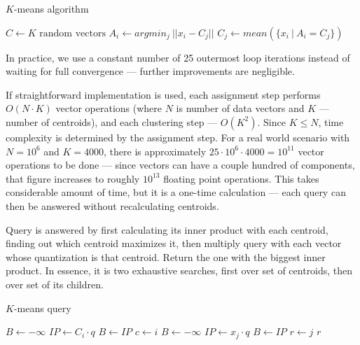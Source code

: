 \begin{algorithm}[H]
	\caption{$K$-means algorithm}
	\begin{algorithmic}
		\State $C \gets K \text{ random vectors}$
		\Repeat
				\State $A_i \gets argmin_{j} \ || x_i - C_j || $
			\EndFor
				\State $C_j \gets mean(\{x_i\ |\ A_i = C_j\}) $
			\EndFor

		\State {}
	\end{algorithmic}
\end{algorithm}

In practice, we use a constant number of 25 outermost loop iterations
instead of waiting for full convergence --- further improvements are negligible.

If straightforward implementation is used, each assignment step performs
$O(N \cdot K)$ vector operations (where $N$ is number of data vectors and
$K$ --- number of centroids), and each clustering step --- $O(K^2)$. Since
$K \le N$, time complexity is determined by the assignment step. For a real
world scenario with $N = 10^6$ and $K = 4000$, there is approximately
$25 \cdot 10^6 \cdot 4000 = 10^{11}$ vector operations to be done --- since vectors
can have a couple hundred of components, that figure increases to roughly
$10^{13}$ floating point operations. This takes considerable amount of time,
but it is a one-time calculation --- each query can then be answered without
recalculating centroids.

Query is answered by first calculating its inner product with each centroid,
finding out which centroid maximizes it, then multiply query with each vector
whose quantization is that centroid. Return the one
with the biggest inner product. In essence, it is two exhaustive searches,
first over set of centroids, then over set of its children.

\begin{algorithm}[H]
	\caption{$K$-means query}
	\begin{algorithmic}
		\State $B \gets -\infty$
		\For{$ i < K $}
			\State $IP \gets C_i \cdot q$
			\If{$IP > B$}
				\State $B \gets IP$
				\State $c \gets i$
			\EndIf
		\EndFor
		\State $B \gets -\infty$
		\For{$ j \in \{ j\ |\ A_j = c \} $}
			\State $IP \gets x_j \cdot q$
			\If {$IP > B$}
				\State $B \gets IP$
				\State $r \gets j$
			\EndIf
		\EndFor
		\State \Return $r$
	\end{algorithmic}
\end{algorithm}

